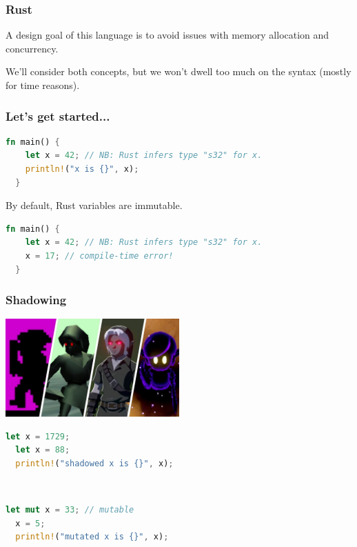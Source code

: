 \begin{frame}
\frametitle{Rust}

A design goal of this language is to avoid issues with memory allocation and concurrency. 

We'll consider both concepts, but we won't dwell too much on the syntax (mostly for time reasons).


\end{frame}



\begin{frame}[fragile]
\frametitle{Let's get started...}

\begin{lstlisting}[language=Rust]
  fn main() {
    let x = 42; // NB: Rust infers type "s32" for x.
    println!("x is {}", x);
  }
\end{lstlisting}
By default, Rust variables are \alert{immutable}.
\vspace*{-.5em}
\begin{lstlisting}[language=Rust]
  fn main() {
    let x = 42; // NB: Rust infers type "s32" for x.
    x = 17; // compile-time error!
  }
\end{lstlisting}

\end{frame}

\begin{frame}[fragile]
\frametitle{Shadowing}

\begin{center}
	\includegraphics[width=0.5\textwidth]{images/darklink.jpg}
\end{center}

\vspace*{-1.5em}
\begin{minipage}{.49\textwidth}
\begin{lstlisting}[language=Rust]
  let x = 1729;
  let x = 88;
  println!("shadowed x is {}", x);
\end{lstlisting}
\end{minipage}\
\begin{minipage}{.49\textwidth}
\begin{lstlisting}[language=Rust]
  let mut x = 33; // mutable
  x = 5;
  println!("mutated x is {}", x);
\end{lstlisting}
\end{minipage}

\end{frame}



